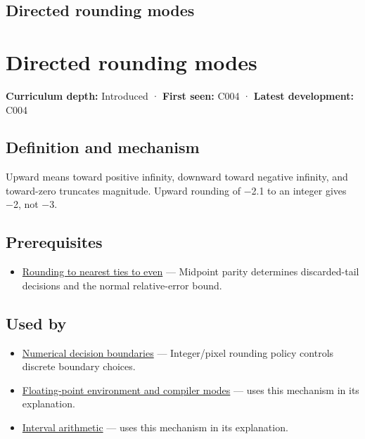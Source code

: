 \hypertarget{appendix-637d164ae5ca}{}
\section*{Directed rounding modes}
\chapter{Directed rounding modes}\label{appendix-637d164ae5ca-directed-rounding-modes}

\textbf{Curriculum depth:} Introduced · \textbf{First seen:} C004 · \textbf{Latest development:} C004

\section{Definition and mechanism}\label{appendix-637d164ae5ca-definition-and-mechanism}

Upward means toward positive infinity, downward toward negative infinity, and toward-zero truncates magnitude. Upward rounding of −2.1 to an integer gives −2, not −3.

\section{Prerequisites}\label{appendix-637d164ae5ca-prerequisites}

\begin{itemize}
\tightlist
\item
  \hyperref[appendix-614afe1de592]{Rounding to nearest ties to even} --- Midpoint parity determines discarded-tail decisions and the normal relative-error bound.
\end{itemize}

\section{Used by}\label{appendix-637d164ae5ca-used-by}

\begin{itemize}
\item
  \hyperref[appendix-c80db39080be]{Numerical decision boundaries} --- Integer/pixel rounding policy controls discrete boundary choices.
\item
  \hyperref[appendix-f11d1a521253]{Floating-point environment and compiler modes} --- uses this mechanism in its explanation.
\item
  \hyperref[appendix-1823a14330cb]{Interval arithmetic} --- uses this mechanism in its explanation.
\end{itemize}


